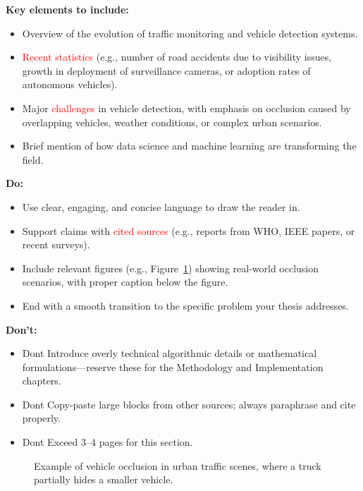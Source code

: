 \documentclass[12pt,a4paper]{report}
\theoremstyle{definition}
\theoremstyle{remark}
\begin{document}
\noindent \textbf{Key elements to include:}
\begin{itemize}
    \item Overview of the evolution of traffic monitoring and vehicle detection systems.
    \item \textcolor{red}{Recent statistics} (e.g., number of road accidents due to visibility issues, growth in deployment of surveillance cameras, or adoption rates of autonomous vehicles).
    \item Major \textcolor{red}{challenges} in vehicle detection, with emphasis on occlusion caused by overlapping vehicles, weather conditions, or complex urban scenarios.
    \item Brief mention of how data science and machine learning are transforming the field.
\end{itemize}

\noindent \textbf{Do:}
\begin{itemize}
    \item Use clear, engaging, and concise language to draw the reader in.
    \item Support claims with \textcolor{red}{cited sources} (e.g., reports from WHO, IEEE papers, or recent surveys).
    \item Include relevant figures (e.g., Figure~\ref{fig:occlusion-example}) showing real-world occlusion scenarios, with proper caption below the figure.
    \item End with a smooth transition to the specific problem your thesis addresses.
\end{itemize}

\noindent \textbf{Don’t:}
\begin{itemize}
    \item Dont Introduce overly technical algorithmic details or mathematical formulations—reserve these for the Methodology and Implementation chapters.
    \item Dont Copy-paste large blocks from other sources; always paraphrase and cite properly.
    \item Dont Exceed 3--4 pages for this section.
\end{itemize}

\begin{figure}[htbp]
    \centering
    \caption{Example of vehicle occlusion in urban traffic scenes, where a truck partially hides a smaller vehicle.}
    \label{fig:occlusion-example}
\end{figure}
\end{document}
